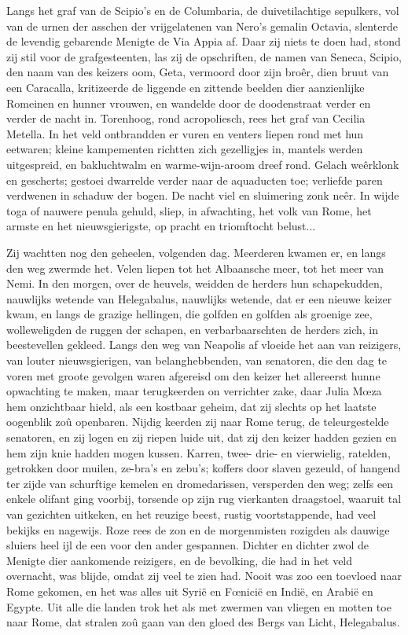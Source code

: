 \documentclass[a4paper, 12pt, oneside, dutch]{article}
\begin{document}
Langs het graf van de Scipio's en de Columbaria, de duivetilachtige sepulkers, vol van de urnen der asschen der vrijgelatenen van Nero's gemalin Octavia, slenterde de levendig gebarende Menigte de Via Appia af. Daar zij niets te doen had, stond zij stil voor de grafgesteenten, las zij de opschriften, de namen van Seneca, Scipio, den naam van des keizers oom, Geta, vermoord door zijn broêr, dien bruut van een Caracalla, kritizeerde de liggende en zittende beelden dier aanzienlijke Romeinen en hunner vrouwen, en wandelde door de doodenstraat verder en verder de nacht in. Torenhoog, rond acropoliesch, rees het graf van Cecilia Metella. In het veld ontbrandden er vuren en venters liepen rond met hun eetwaren; kleine kampementen richtten zich gezelligjes in, mantels werden uitgespreid, en bakluchtwalm en warme-wijn-aroom dreef rond. Gelach weêrklonk en gescherts; gestoei dwarrelde verder naar de aquaducten toe; verliefde paren verdwenen in schaduw der bogen. De nacht viel en sluimering zonk neêr. In wijde toga of nauwere penula gehuld, sliep, in afwachting, het volk van Rome, het armste en het nieuwsgierigste, op pracht en triomftocht belust...

Zij wachtten nog den geheelen, volgenden dag. Meerderen kwamen er, en langs den weg zwermde het. Velen liepen tot het Albaansche meer, tot het meer van Nemi. In den morgen, over de heuvels, weidden de herders hun schapekudden, nauwlijks wetende van Helegabalus, nauwlijks wetende, dat er een nieuwe keizer kwam, en langs de grazige hellingen, die golfden en golfden als groenige zee, wolleweligden de ruggen der schapen, en verbarbaarschten de herders zich, in beestevellen gekleed. Langs den weg van Neapolis af vloeide het aan van reizigers, van louter nieuwsgierigen, van belanghebbenden, van senatoren, die den dag te voren met groote gevolgen waren afgereisd om den keizer het allereerst hunne opwachting te maken, maar terugkeerden on verrichter zake, daar Julia Mœza hem onzichtbaar hield, als een kostbaar geheim, dat zij slechts op het laatste oogenblik zoû openbaren. Nijdig keerden zij naar Rome terug, de teleurgestelde senatoren, en zij logen en zij riepen luide uit, dat zij den keizer hadden gezien en hem zijn knie hadden mogen kussen. Karren, twee- drie- en vierwielig, ratelden, getrokken door muilen, ze-bra's en zebu's; koffers door slaven gezeuld, of hangend ter zijde van schurftige kemelen en dromedarissen, versperden den weg; zelfs een enkele olifant ging voorbij, torsende op zijn rug vierkanten draagstoel, waaruit tal van gezichten uitkeken, en het reuzige beest, rustig voortstappende, had veel bekijks en nagewijs. Roze rees de zon en de morgenmisten rozigden als dauwige sluiers heel ijl de een voor den ander gespannen. Dichter en dichter zwol de Menigte dier aankomende reizigers, en de bevolking, die had in het veld overnacht, was blijde, omdat zij veel te zien had. Nooit was zoo een toevloed naar Rome gekomen, en het was alles uit Syrië en Fœnicië en Indië, en Arabië en Egypte. Uit alle die landen trok het als met zwermen van vliegen en motten toe naar Rome, dat stralen zoû gaan van den gloed des Bergs van Licht, Helegabalus.
\end{document}
